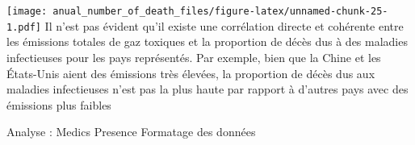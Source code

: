 \documentclass[
]{article}
\newenvironment{Shaded}{\begin{snugshade}}{\end{snugshade}}
\newcommand{\AttributeTok}[1]{\textcolor[rgb]{0.13,0.29,0.53}{#1}}
\newcommand{\DecValTok}[1]{\textcolor[rgb]{0.00,0.00,0.81}{#1}}
\newcommand{\FunctionTok}[1]{\textcolor[rgb]{0.13,0.29,0.53}{\textbf{#1}}}
\newcommand{\NormalTok}[1]{#1}
\newcommand{\OtherTok}[1]{\textcolor[rgb]{0.56,0.35,0.01}{#1}}
\newcommand{\SpecialCharTok}[1]{\textcolor[rgb]{0.81,0.36,0.00}{\textbf{#1}}}
\newcommand{\StringTok}[1]{\textcolor[rgb]{0.31,0.60,0.02}{#1}}
\begin{document}
\texttt{[image: anual\_number\_of\_death\_files/figure-latex/unnamed-chunk-25-1.pdf]}
Il n'est pas évident qu'il existe une corrélation directe et cohérente
entre les émissions totales de gaz toxiques et la proportion de décès
dus à des maladies infectieuses pour les pays représentés. Par exemple,
bien que la Chine et les États-Unis aient des émissions très élevées, la
proportion de décès dus aux maladies infectieuses n'est pas la plus
haute par rapport à d'autres pays avec des émissions plus faibles

Analyse : Medics Presence Formatage des données

\begin{Shaded}
\end{Shaded}
\end{document}
